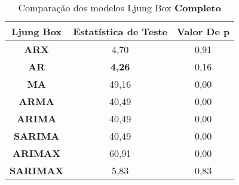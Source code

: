 \begin{table}[H]
	\centering
	\caption{Comparação dos modelos Ljung Box \textbf{Completo} }\label{tb:lbcm}
	\begin{tabular}{@{}ccc@{}}
		\toprule
		\textbf{Ljung Box} & \textbf{Estatística de Teste} & \textbf{Valor De p} \\ \midrule
\textbf{ARX}       & 4,70                          & 0,91                \\
\textbf{AR}        & \textbf{4,26}                          & 0,16                \\
\textbf{MA}        & 49,16                         & 0,00                \\
\textbf{ARMA}      & 40,49                         & 0,00                \\
\textbf{ARIMA}     & 40,49                         & 0,00                \\
\textbf{SARIMA}    & 40,49                         & 0,00                \\
\textbf{ARIMAX}    & 60,91                         & 0,00                \\
\textbf{SARIMAX}   & 5,83                          & 0,83                \\ \bottomrule
	\end{tabular}

	
\end{table}

